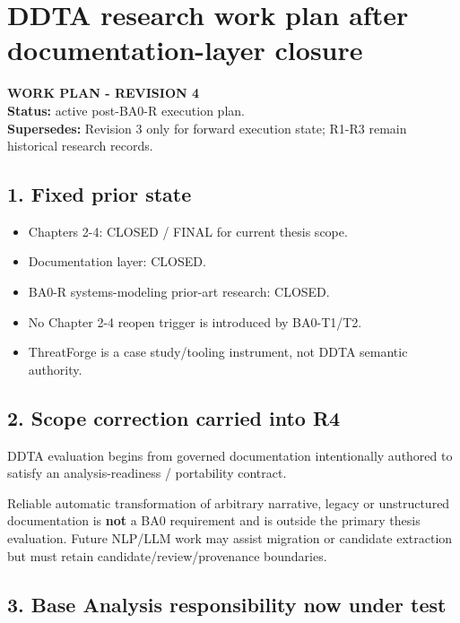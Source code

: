 \documentclass[
  10pt,
  a4paper,
]{article}
\author{}
\date{}
\providecommand{\tightlist}{%
  \setlength{\itemsep}{0pt}\setlength{\parskip}{0pt}}
\begin{document}
\section{DDTA research work plan after documentation-layer
closure}\label{ddta-research-work-plan-after-documentation-layer-closure}

\textbf{WORK PLAN - REVISION 4}\\
\textbf{Status:} active post-BA0-R execution plan.\\
\textbf{Supersedes:} Revision 3 only for forward execution state; R1-R3
remain historical research records.

\subsection{1. Fixed prior state}\label{1-fixed-prior-state}

\begin{itemize}
\tightlist
\item
  Chapters 2-4: CLOSED / FINAL for current thesis scope.
\item
  Documentation layer: CLOSED.
\item
  BA0-R systems-modeling prior-art research: CLOSED.
\item
  No Chapter 2-4 reopen trigger is introduced by BA0-T1/T2.
\item
  ThreatForge is a case study/tooling instrument, not DDTA semantic
  authority.
\end{itemize}

\subsection{2. Scope correction carried into
R4}\label{2-scope-correction-carried-into-r4}

DDTA evaluation begins from governed documentation intentionally
authored to satisfy an analysis-readiness / portability contract.

Reliable automatic transformation of arbitrary narrative, legacy or
unstructured documentation is \textbf{not} a BA0 requirement and is
outside the primary thesis evaluation. Future NLP/LLM work may assist
migration or candidate extraction but must retain
candidate/review/provenance boundaries.

\subsection{3. Base Analysis responsibility now under
test}\label{3-base-analysis-responsibility-now-under-test}
\end{document}
